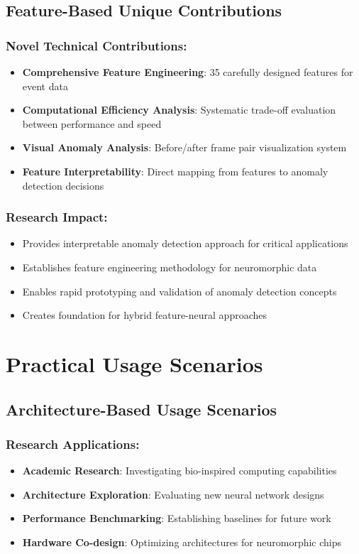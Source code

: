 \documentclass[11pt,a4paper]{article}
\begin{document}
\subsection{Feature-Based Unique Contributions}

\subsubsection{Novel Technical Contributions:}
\begin{itemize}
    \item \textbf{Comprehensive Feature Engineering}: 35 carefully designed features for event data
    \item \textbf{Computational Efficiency Analysis}: Systematic trade-off evaluation between performance and speed
    \item \textbf{Visual Anomaly Analysis}: Before/after frame pair visualization system
    \item \textbf{Feature Interpretability}: Direct mapping from features to anomaly detection decisions
\end{itemize}

\subsubsection{Research Impact:}
\begin{itemize}
    \item Provides interpretable anomaly detection approach for critical applications
    \item Establishes feature engineering methodology for neuromorphic data
    \item Enables rapid prototyping and validation of anomaly detection concepts
    \item Creates foundation for hybrid feature-neural approaches
\end{itemize}

\section{Practical Usage Scenarios}

\subsection{Architecture-Based Usage Scenarios}

\subsubsection{Research Applications:}
\begin{itemize}
    \item \textbf{Academic Research}: Investigating bio-inspired computing capabilities
    \item \textbf{Architecture Exploration}: Evaluating new neural network designs
    \item \textbf{Performance Benchmarking}: Establishing baselines for future work
    \item \textbf{Hardware Co-design}: Optimizing architectures for neuromorphic chips
\end{itemize}
\end{document}
